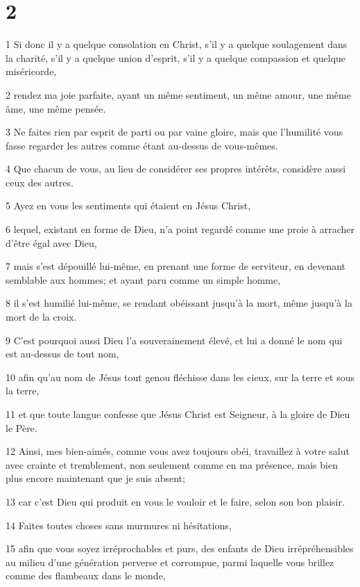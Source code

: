 \chapter{2}

\par 1 Si donc il y a quelque consolation en Christ, s'il y a quelque soulagement dans la charité, s'il y a quelque union d'esprit, s'il y a quelque compassion et quelque miséricorde,
\par 2 rendez ma joie parfaite, ayant un même sentiment, un même amour, une même âme, une même pensée.
\par 3 Ne faites rien par esprit de parti ou par vaine gloire, mais que l'humilité vous fasse regarder les autres comme étant au-dessus de vous-mêmes.
\par 4 Que chacun de vous, au lieu de considérer ses propres intérêts, considère aussi ceux des autres.
\par 5 Ayez en vous les sentiments qui étaient en Jésus Christ,
\par 6 lequel, existant en forme de Dieu, n'a point regardé comme une proie à arracher d'être égal avec Dieu,
\par 7 mais s'est dépouillé lui-même, en prenant une forme de serviteur, en devenant semblable aux hommes; et ayant paru comme un simple homme,
\par 8 il s'est humilié lui-même, se rendant obéissant jusqu'à la mort, même jusqu'à la mort de la croix.
\par 9 C'est pourquoi aussi Dieu l'a souverainement élevé, et lui a donné le nom qui est au-dessus de tout nom,
\par 10 afin qu'au nom de Jésus tout genou fléchisse dans les cieux, sur la terre et sous la terre,
\par 11 et que toute langue confesse que Jésus Christ est Seigneur, à la gloire de Dieu le Père.
\par 12 Ainsi, mes bien-aimés, comme vous avez toujours obéi, travaillez à votre salut avec crainte et tremblement, non seulement comme en ma présence, mais bien plus encore maintenant que je suis absent;
\par 13 car c'est Dieu qui produit en vous le vouloir et le faire, selon son bon plaisir.
\par 14 Faites toutes choses sans murmures ni hésitations,
\par 15 afin que vous soyez irréprochables et purs, des enfants de Dieu irrépréhensibles au milieu d'une génération perverse et corrompue, parmi laquelle vous brillez comme des flambeaux dans le monde,
